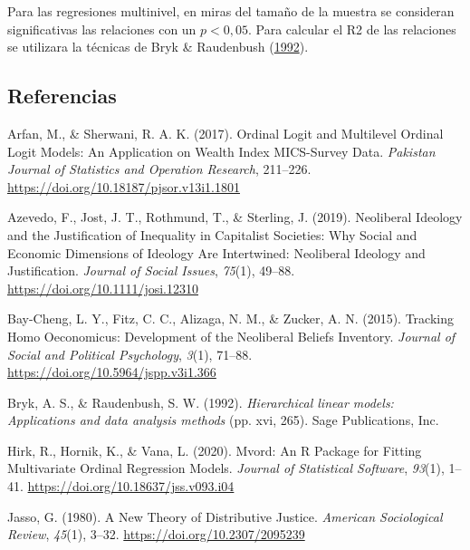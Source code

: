 \documentclass[
  12pt,
]{article}
\newlength{\cslhangindent}
\newenvironment{cslreferences}%
  {\setlength{\parindent}{0pt}%
  \everypar{\setlength{\hangindent}{\cslhangindent}}\ignorespaces}%
  {\par}
\begin{document}
Para las regresiones multinivel, en miras del tamaño de la muestra se
consideran significativas las relaciones con un \(p< 0,05\). Para
calcular el R2 de las relaciones se utilizara la técnicas de Bryk \&
Raudenbush (\protect\hyperlink{ref-bryk_Hierarchical_1992}{1992}).

\pagebreak

\hypertarget{referencias}{%
\subsection*{Referencias}\label{referencias}}

\hypertarget{refs}{}
\begin{cslreferences}
\leavevmode\hypertarget{ref-arfan_Ordinal_2017}{}%
Arfan, M., \& Sherwani, R. A. K. (2017). Ordinal Logit and Multilevel
Ordinal Logit Models: An Application on Wealth Index MICS-Survey Data.
\emph{Pakistan Journal of Statistics and Operation Research}, 211--226.
\url{https://doi.org/10.18187/pjsor.v13i1.1801}

\leavevmode\hypertarget{ref-azevedo_Neoliberal_2019}{}%
Azevedo, F., Jost, J. T., Rothmund, T., \& Sterling, J. (2019).
Neoliberal Ideology and the Justification of Inequality in Capitalist
Societies: Why Social and Economic Dimensions of Ideology Are
Intertwined: Neoliberal Ideology and Justification. \emph{Journal of
Social Issues}, \emph{75}(1), 49--88.
\url{https://doi.org/10.1111/josi.12310}

\leavevmode\hypertarget{ref-bay-cheng_Tracking_2015a}{}%
Bay-Cheng, L. Y., Fitz, C. C., Alizaga, N. M., \& Zucker, A. N. (2015).
Tracking Homo Oeconomicus: Development of the Neoliberal Beliefs
Inventory. \emph{Journal of Social and Political Psychology},
\emph{3}(1), 71--88. \url{https://doi.org/10.5964/jspp.v3i1.366}

\leavevmode\hypertarget{ref-bryk_Hierarchical_1992}{}%
Bryk, A. S., \& Raudenbush, S. W. (1992). \emph{Hierarchical linear
models: Applications and data analysis methods} (pp. xvi, 265). Sage
Publications, Inc.

\leavevmode\hypertarget{ref-hirk_mvord_2020}{}%
Hirk, R., Hornik, K., \& Vana, L. (2020). Mvord: An R Package for
Fitting Multivariate Ordinal Regression Models. \emph{Journal of
Statistical Software}, \emph{93}(1), 1--41.
\url{https://doi.org/10.18637/jss.v093.i04}

\leavevmode\hypertarget{ref-jasso_New_1980}{}%
Jasso, G. (1980). A New Theory of Distributive Justice. \emph{American
Sociological Review}, \emph{45}(1), 3--32.
\url{https://doi.org/10.2307/2095239}


\end{cslreferences}
\end{document}
